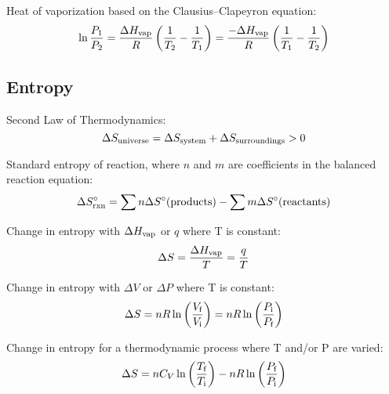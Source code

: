\documentclass[10pt]{article}
\begin{document}
Heat of vaporization based on the Clausius--Clapeyron equation:
\begin{equation*}
\ln \frac{P_1}{P_2} = \frac{\Delta H_\textnormal{vap}}{R}\left(\frac{1}{T_2} - \frac{1}{T_1}\right) = \frac{-\Delta H_\textnormal{vap}}{R}\left(\frac{1}{T_1} - \frac{1}{T_2}\right)
\end{equation*}


\newpage
\subsection{Entropy}

Second Law of Thermodynamics:
\begin{equation*}
\Delta S_\textnormal{universe} = \Delta S_\textnormal{system} + \Delta S_\textnormal{surroundings} > 0
\end{equation*}

Standard entropy of reaction, where $n$ and $m$ are coefficients in the balanced reaction equation:
\begin{equation*}
\Delta S\not_\textnormal{rxn} = \sum{n\Delta S\not(\textnormal{products})}-\sum{m\Delta S\not(\textnormal{reactants})}
\end{equation*}

Change in entropy with $\Delta H_{\textnormal{vap}}$ or $q$ where T is constant:
\begin{equation*}
\Delta S = \frac{\Delta H_{\textnormal{vap}}}{T} = \frac{q}{T}
\end{equation*}

Change in entropy with $\Delta V$ or $\Delta P$ where T is constant:
\begin{equation*}
\Delta S = nR\ln \left(\frac{V_\textnormal{f}}{V_\textnormal{i}}\right) = nR\ln \left(\frac{P_\textnormal{i}}{P_\textnormal{f}}\right)
\end{equation*}

Change in entropy for a thermodynamic process where T and/or P are varied:
\begin{equation*}
\Delta S = nC_V\ln\left(\frac{T_\textnormal{f}}{T_\textnormal{i}}\right) - nR\ln\left(\frac{P_\textnormal{f}}{P_\textnormal{i}}\right)
\end{equation*}
\end{document}
